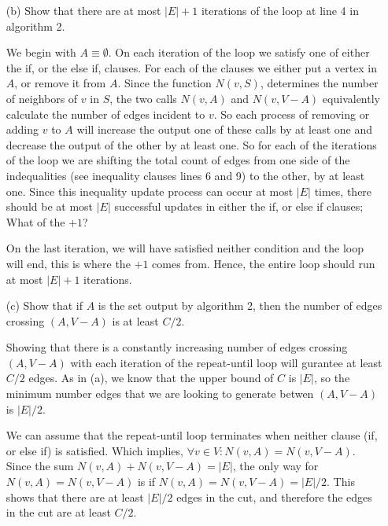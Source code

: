 \documentclass[11pt]{article}
\begin{document}
\begin{itemize}
\item[(b)] Show that there are at most $|E|+1$ iterations of the loop at
    line 4 in algorithm 2.
    
    We begin with $A\equiv \emptyset$. On each iteration of the loop we satisfy 
    one of either the if, or the else if, clauses. For each of the clauses we
    either put a vertex in $A$, or remove it from $A$. Since the function
    $N(v,S)$, determines the number of neighbors of $v$ in $S$, the two 
    calls $N(v,A)$ and $N(v,V-A)$ equivalently
    calculate the number of edges incident to $v$. So each process of removing
    or adding $v$ to $A$ will increase the output one of these calls by at least
    one and decrease the output of the other by at least one. 
    So for each of the iterations of the loop we are shifting the total count
    of edges from one side of the indequalities (see inequality clauses lines 6 and 9)
    to the other, by at least one. Since this inequality update process can occur at most 
    $|E|$ times, there should be at most $|E|$ successful updates in either
    the if, or else if clauses;  What of the $+1$?
    
    On the last iteration, we will have satisfied neither condition and 
    the loop will end, this is where the $+1$ comes from. Hence, the entire 
    loop should run at most $|E|+1$ iterations. 
    
  \item[(c)] Show that if $A$ is the set output by algorithm 2, then the number 
    of edges crossing $(A,V-A)$ is at least $C/2$.
    
    Showing that there is a constantly increasing number of edges crossing $(A,V-A)$ 
    with each iteration of the repeat-until loop will gurantee at least $C/2$ edges.
    As in (a), we know that the upper bound of $C$ is $|E|$, so the minimum number
    edges that we are looking to generate betwen $(A,V-A)$ is $|E|/2$.

    We can assume that the repeat-until loop terminates when neither
    clause (if, or else if) is satisfied. Which implies, $\forall v\in V:
    N(v,A) = N(v,V-A)$. Since the sum $N(v,A) + N(v,V-A) = |E|$, the only 
    way for $N(v,A) = N(v,V-A)$ is if $N(v,A) = N(v,V-A) = |E|/2$. This shows that
    there are at least $|E|/2$ edges in the cut, and therefore the edges in the 
    cut are at least $C/2$.
    
\end{itemize}
\end{document}
